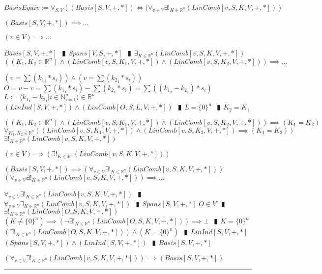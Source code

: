 \documentclass{book}
\newcommand{\abr}{:=}
\newcommand{\pipe}{$\phantom{(}\vrectangleblack\phantom{)}$}
\newcommand{\pr}[1]{\left(#1\right)}
\begin{document}
$BasisEquiv \abr \forall_{S, V}\pr{(Basis[S, V, +, *]) \iff (\forall_{v \in V} \exists!_{K \in \mathbb{R}^n}(LinComb[v, S, K, V, +, *])}$
\begin{enumerate}
  \lit $(Basis[S, V, +, *]) \implies \ldots$
  \begin{enumerate}
    \lit $(v \in V) \implies \ldots$
    \begin{enumerate}
      \lit $Basis[S, V, +, *]$ \pipe $Spans[V, S, +, *]$ \pipe $\exists_{K \in \mathbb{R}^n}(LinComb[v, S, K, V, +, *])$
      \lit $\pr{(K_1, K_2 \in \mathbb{R}^n) \land (LinComb[v, S, K_1, V, +, *]) \land (LinComb[v, S, K_2, V, +, *])} \implies \ldots$
      \begin{enumerate}
        \lit $\pr{v = \sum({k_1}_i * s_i)} \land \pr{v = \sum({k_2}_i * s_i)}$
        \lit $O = v - v = \sum({k_1}_i * s_i) - \sum({k_2}_i * s_i) = \sum\pr{({k_1}_i - {k_2}_i) * s_i}$
        \lit $L \abr \langle {k_1}_i - {k_2}_i | i \in \mathbb{N}_{i = 1}^n \rangle \in \mathbb{R}^n$
        \lit $(LinInd[S, V, +, *]) \land (LinComb[O, S, L, V, +, *])$ \pipe $L = \{0\}^n$ \pipe $K_2 = K_1$
      \end{enumerate}
      \lit $\pr{(K_1, K_2 \in \mathbb{R}^n) \land (LinComb[v, S, K_1, V, +, *]) \land (LinComb[v, S, K_2, V, +, *])} \implies (K_1 = K_2)$
      \lit $\forall_{K_1, K_2 \in \mathbb{R}^n}\pr{(LinComb[v, S, K_1, V, +, *]) \land (LinComb[v, S, K_2, V, +, *]) \implies (K_1 = K_2)}$
      \lit $\exists!_{K \in \mathbb{R}^n}(LinComb[v, S, K, V, +, *])$
    \end{enumerate}
    \lit $(v \in V) \implies \pr{\exists!_{K \in \mathbb{R}^n}(LinComb[v, S, K, V, +, *])}$
    \end{enumerate}
  \lit $(Basis[S, V, +, *]) \implies \pr{\forall_{v \in V} \exists!_{K \in \mathbb{R}^n}(LinComb[v, S, K, V, +, *])}$
  \lit $\pr{\forall_{v \in V} \exists!_{K \in \mathbb{R}^n}(LinComb[v, S, K, V, +, *])} \implies \ldots$
  \begin{enumerate}
    \lit $\forall_{v \in V} \exists!_{K \in \mathbb{R}^n}(LinComb[v, S, K, V, +, *])$ \pipe $\forall_{v \in V} \exists_{K \in \mathbb{R}^n}(LinComb[v, S, K, V, +, *])$ \pipe $Spans[S, V, +, *]$
    \lit $O \in V$ \pipe $\exists!_{K \in \mathbb{R}^n}(LinComb[O, S, K, V, +, *])$
    \lit $(K \neq \{0\}^n) \implies \pr{\lnot \exists!_{K \in \mathbb{R}^n}(LinComb[O, S, K, V, +, *])} \implies \bot$ \pipe $K = \{0\}^n$
    \lit $\pr{\exists!_{K \in \mathbb{R}^n}(LinComb[O, S, K, V, +, *])} \land (K = \{0\}^n)$ \pipe $LinInd[S, V, +, *]$
    \lit $(Spans[S, V, +, *]) \land (LinInd[S, V, +, *])$ \pipe $Basis[S, V, +, *]$
  \end{enumerate}
  \lit $\pr{\forall_{v \in V} \exists!_{K \in \mathbb{R}^n}(LinComb[v, S, K, V, +, *])} \implies (Basis[S, V, +, *])$
\end{enumerate} \vspace{.75mm} \hrule \vspace{.75mm} \ \\ 
\end{document}
